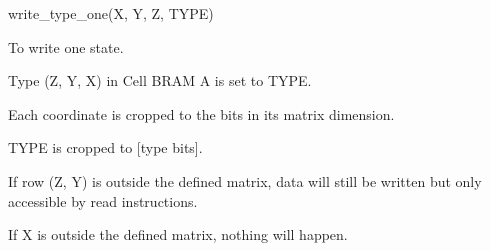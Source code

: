 

\format
write\_type\_one(X, Y, Z, TYPE)

\purpose

To write one state.

\description

Type (Z, Y, X) in Cell BRAM A is set to TYPE.

\notes

Each coordinate is cropped to the bits in its matrix dimension.

TYPE is cropped to [type bits].

If row (Z, Y) is outside the defined matrix, data will still be written but only accessible by read instructions.

If X is outside the defined matrix, nothing will happen.
